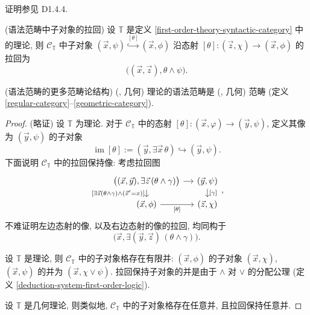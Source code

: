 证明参见 \cite{Elephant} D1.4.4.

\begin{prop}
	{(语法范畴中子对象的拉回)}
	设 $\mathbb T$ 是定义 \ref{first-order-theory-syntactic-category} 中的理论, 则
	$\mathcal C_{\mathbb T}$ 中子对象 $(\vec x,\psi)\overset{[\theta]}{\hookrightarrow} (\vec x,\phi)$ 沿态射 $[\theta]\colon (\vec z,\chi)\to (\vec x,\phi)$ 的拉回为
	\[
	\big((\vec x,\vec z),\theta\land\psi\big).
	\]
\end{prop}

\begin{prop}
	[label={syntactic-category-structures}]
	{(语法范畴的更多范畴论结构)}
	\regular{} (\coherent{}, 几何) 理论的语法范畴是\regular{} (\coherent{}, 几何) 范畴 (定义 \ref{regular-category}--\ref{geometric-category}).
\end{prop}
\begin{proof} (略证)
	设 $\mathbb T$ 为\regular{}理论. 对于 $\mathcal C_{\mathbb T}$ 中的态射 $[\theta]\colon (\vec x,\varphi)\to (\vec y,\psi)$, 定义其像为 $(\vec y,\psi)$ 的子对象
		$$
		\operatorname{im}[\theta] :=
		(\vec y,\exists \vec x\,\theta)\hookrightarrow (\vec y,\psi).
		$$
		下面说明 $\mathcal C_{\mathbb T}$ 中的拉回保持像: 考虑拉回图
		\[
		\begin{tikzcd}[ampersand replacement=\&,sep=small]
			\big((\vec x,\vec y),\exists \vec z\,(\theta\land\gamma)\big) \& {(\vec y,\psi)} \\
			{(\vec x,\phi)} \& {(\vec z,\chi)}
			\arrow["{[\gamma]}", from=1-2, to=2-2]
			\arrow["{[\theta]}"', from=2-1, to=2-2]
			\arrow["{[\exists\vec z (\theta\land\gamma)\land (\vec x'=x)]}"',from=1-1,to=2-1]
			\arrow[from=1-1,to=1-2]
		\end{tikzcd},
		\]
		不难证明左边态射的像, 以及右边态射的像的拉回, 均同构于
		\[
		\big(
		\vec x,
		\exists (\vec y,\vec z)\,
		(\theta\land\gamma)
		\big).
		\]
	
	设 $\mathbb T$ 是\coherent{}理论, 则 $\mathcal C_{\mathbb T}$ 中的子对象格存在有限并: $(\vec x,\phi)$ 的子对象 $(\vec x,\chi)$, $(\vec x,\psi)$ 的并为
	$(\vec x,\chi\lor\psi)$. 拉回保持子对象的并是由于 $\land$ 对 $\lor$ 的分配公理 (定义 \ref{deduction-system-first-order-logic}).
	
	设 $\mathbb T$ 是几何理论, 则类似地, $\mathcal C_{\mathbb T}$ 中的子对象格存在任意并, 且拉回保持任意并.
\end{proof}

